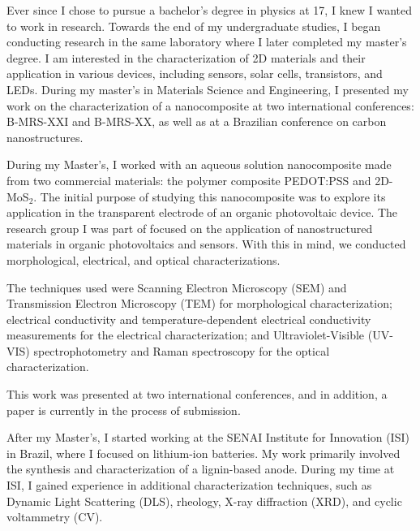 \documentclass{article}
\begin{document}

Ever since I chose to pursue a bachelor's degree in physics at 17, I knew I wanted to work in research. Towards the end of my undergraduate studies, I began conducting research in the same laboratory where I later completed my master's degree. I am interested in the characterization of 2D materials and their application in various devices, including sensors, solar cells, transistors, and LEDs. During my master's in Materials Science and Engineering, I presented my work on the characterization of a nanocomposite at two international conferences: B-MRS-XXI and B-MRS-XX, as well as at a Brazilian conference on carbon nanostructures.


During my Master's, I worked with an aqueous solution nanocomposite made from two commercial materials: the polymer composite PEDOT:PSS  and 2D-MoS$_2$. The initial purpose of studying this nanocomposite was to explore its application in the transparent electrode of an organic photovoltaic device. The research group I was part of focused on the application of nanostructured materials in organic photovoltaics and sensors. With this in mind, we conducted morphological, electrical, and optical characterizations.

The techniques used were Scanning Electron Microscopy (SEM) and Transmission Electron Microscopy (TEM) for morphological characterization; electrical conductivity and temperature-dependent electrical conductivity measurements for the electrical characterization; and Ultraviolet-Visible (UV-VIS) spectrophotometry and Raman spectroscopy for the optical characterization.

This work was presented at two international conferences, and in addition, a paper is currently in the process of submission.


After my Master's, I started working at the SENAI Institute for Innovation (ISI) in Brazil, where I focused on lithium-ion batteries. My work primarily involved the synthesis and characterization of a lignin-based anode. During my time at ISI, I gained experience in additional characterization techniques, such as Dynamic Light Scattering (DLS), rheology, X-ray diffraction (XRD), and cyclic voltammetry (CV).
\end{document}
